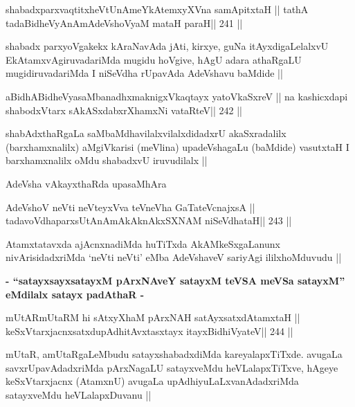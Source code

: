 \begin{shl}
shabadxparxvaqtitxheVtUnAmeYkAtemxyXVna samApitxtaH ||
tathA tadaBidheVyAnAmAdeVshoV\s yaM mataH paraH\hfill || 241 ||
\end{shl}

\begin{artha}
shabadx parxyoVgakekx kAraNavAda jAti, kirxye, guNa itAyxdigaLelalxvU
EkAtamxvAgiruvadariMda mugidu hoVgive, hAgU adara athaRgaLU
mugidiruvadariMda I niSeVdha rUpavAda AdeVshavu baMdide ||
\end{artha}

\begin{shl}
aBidhABidheVyasaMbanadhxmaknigxVkaqtayx yatoV\s kaSxreV ||
na kashicxdapi shabodxV\s tarx sAkASxdabxrXhamxNi vataRteV\hfill || 242 ||
\end{shl}

\begin{artha}
shabAdxthaRgaLa saMbaMdhavilalxvilalxdidadxrU akaSxradalilx
(barxhamxnalilx) aMgiVkarisi (meVlina) upadeVshagaLu (baMdide)
vasutxtaH I barxhamxnalilx oMdu shabadxvU iruvudilalx ||
\end{artha}

\begin{center}
AdeVsha vAkayxthaRda upasaMhAra
\end{center}

\begin{shl}
AdeVshoV neVti neVteyxVva teVneVha GaTateV\s cnajxsA ||
tadavoVdhaparxsUtAnAmAkAknAkxSXNAM niSeVdhataH\hfill || 243 ||
\end{shl}

\begin{artha}
Atamxtatavxda ajAcnxnadiMda huTiTxda AkAMkeSxgaLanunx
nivArisidadxriMda `neVti neVti' eMba AdeVshaveV sariyAgi
ililxhoMduvudu ||
\end{artha}

\begin{center}
\textbf{- ``satayxsayxsatayxM pArxNAveY satayxM teVSA meVSa satayxM''
  eMdilalx satayx padAthaR -}
\end{center}

\begin{shl}
mUtARmUtaRM hi sAtxyXhaM pArxNAH satAyxsatxdAtamxtaH ||
keSxVtarxjacnxsatxdupAdhitAvxtasxtayx itayxBidhiVyateV\hfill || 244 ||
\end{shl}

\begin{artha}
mUtaR, amUtaRgaLeMbudu satayxshabadxdiMda kareyalapxTiTxde. avugaLa
savxrUpavAdadxriMda pArxNagaLU satayxveMdu heVLalapxTiTxve, hAgeye
keSxVtarxjacnx (AtamxnU) avugaLa upAdhiyuLaLxvanAdadxriMda satayxveMdu
heVLalapxDuvanu ||
\end{artha}

